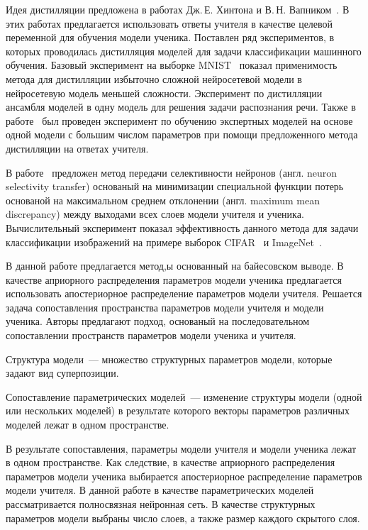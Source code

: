 \documentclass[12pt]{a&t}
\begin{document}
Идея дистилляции предложена в работах Дж.\,Е. Хинтона и В.\,Н. Вапником~\cite{Hinton2015, Vapnik2015, Lopez2016}. В этих работах предлагается использовать ответы учителя в качестве целевой переменной для обучения модели ученика.
Поставлен ряд экспериментов, в которых проводилась дистилляция моделей для задачи классификации машинного обучения.
Базовый эксперимент на выборке MNIST~\cite{mnist} показал применимость метода для дистилляции избыточно сложной нейросетевой модели в нейросетевую модель меньшей сложности.
Эксперимент по дистилляции ансамбля моделей в одну модель для решения задачи распознания речи. Также в работе~\cite{Hinton2015} был проведен эксперимент по обучению экспертных моделей на основе одной модели с большим числом параметров при помощи предложенного метода дистилляции на ответах учителя.

В работе~\cite{Zehao2017} предложен метод передачи селективности нейронов (англ. neuron selectivity transfer) основаный на минимизации специальной функции потерь основаной на максимальном среднем отклонении (англ. maximum mean discrepancy) между выходами всех слоев модели учителя и ученика. Вычислительный эксперимент показал эффективность данного метода для задачи классификации изображений на примере выборок CIFAR~\cite{cifar10} и ImageNet~\cite{imagenet}.

В данной работе предлагается метод,ы основанный на байесовском выводе.
В качестве априорного распределения параметров модели ученика предлагается использовать апостериорное распределение параметров модели учителя.
Решается задача сопоставления пространства параметров модели учителя и модели ученика.
Авторы предлагают подход, основаный на последовательном сопоставлении пространств параметров модели ученика и учителя. 
\begin{definition}
\label{def:structure}
Структура модели~--- множество структурных параметров модели, которые задают вид суперпозиции.
\end{definition}
\begin{definition}
\label{def:sopos}
Сопоставление параметрических моделей~--- изменение структуры модели (одной или нескольких моделей) в результате которого векторы параметров различных моделей лежат в одном пространстве.
\end{definition}
В результате сопоставления, параметры модели учителя и модели ученика лежат в одном пространстве.
Как следствие, в качестве априорного распределения параметров модели ученика выбирается апостериорное распределение параметров модели учителя.
В данной работе в качестве параметрических моделей рассматривается полносвязная нейронная сеть.
В качестве структурных параметров модели выбраны число слоев, а также размер каждого скрытого слоя.
\end{document}
